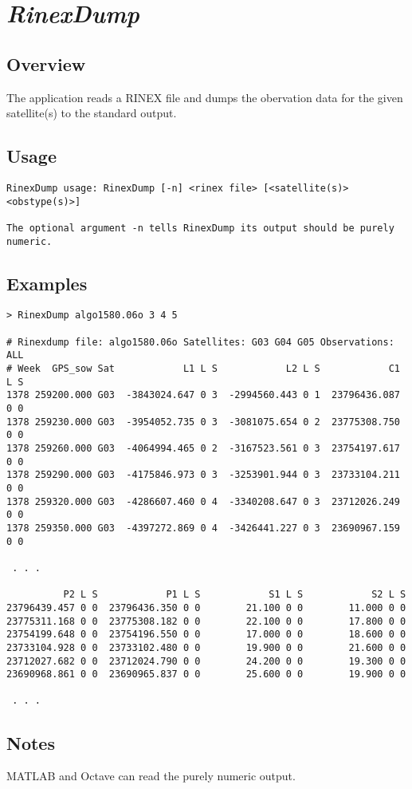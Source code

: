 %
%

\section{\emph{RinexDump}}
\subsection{Overview}
The application reads a RINEX file and dumps the obervation data for the given satellite(s) to the standard output.

\subsection{Usage}
\begin{\outputsize}
\begin{verbatim}
RinexDump usage: RinexDump [-n] <rinex file> [<satellite(s)> <obstype(s)>] 

The optional argument -n tells RinexDump its output should be purely numeric.
\end{verbatim}
\end{\outputsize}

\subsection{Examples}
\begin{\outputsize}
\begin{lstlisting}
> RinexDump algo1580.06o 3 4 5

# Rinexdump file: algo1580.06o Satellites: G03 G04 G05 Observations: ALL
# Week  GPS_sow Sat            L1 L S            L2 L S            C1 L S
1378 259200.000 G03  -3843024.647 0 3  -2994560.443 0 1  23796436.087 0 0
1378 259230.000 G03  -3954052.735 0 3  -3081075.654 0 2  23775308.750 0 0
1378 259260.000 G03  -4064994.465 0 2  -3167523.561 0 3  23754197.617 0 0
1378 259290.000 G03  -4175846.973 0 3  -3253901.944 0 3  23733104.211 0 0
1378 259320.000 G03  -4286607.460 0 4  -3340208.647 0 3  23712026.249 0 0
1378 259350.000 G03  -4397272.869 0 4  -3426441.227 0 3  23690967.159 0 0

 . . .

          P2 L S            P1 L S            S1 L S            S2 L S
23796439.457 0 0  23796436.350 0 0        21.100 0 0        11.000 0 0
23775311.168 0 0  23775308.182 0 0        22.100 0 0        17.800 0 0
23754199.648 0 0  23754196.550 0 0        17.000 0 0        18.600 0 0
23733104.928 0 0  23733102.480 0 0        19.900 0 0        21.600 0 0
23712027.682 0 0  23712024.790 0 0        24.200 0 0        19.300 0 0
23690968.861 0 0  23690965.837 0 0        25.600 0 0        19.900 0 0

 . . .
\end{lstlisting}
\end{\outputsize}

\subsection{Notes}
MATLAB and Octave can read the purely numeric output.

%

